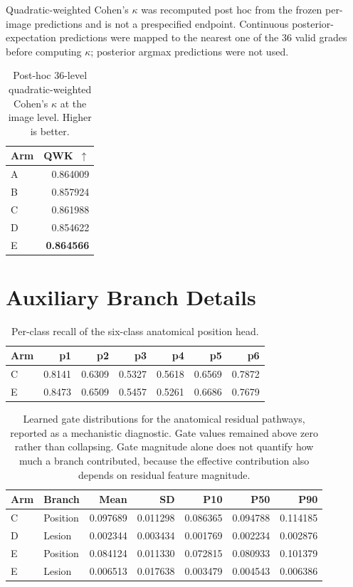 \documentclass[journal]{IEEEtran}
\begin{document}
Quadratic-weighted Cohen's $\kappa$ was recomputed post hoc from the frozen
per-image predictions and is not a prespecified endpoint. Continuous
posterior-expectation predictions were mapped to the nearest one of the 36 valid
grades before computing $\kappa$; posterior argmax predictions were not used.

\begin{table}[!t]
\centering
\caption{Post-hoc 36-level quadratic-weighted Cohen's $\kappa$ at the image
level. Higher is better.}
\label{tab:qwk}
\small
\begin{tabular}{@{}l r@{}}
\toprule
Arm & QWK~$\uparrow$ \\
\midrule
A & 0.864009 \\
B & 0.857924 \\
C & 0.861988 \\
D & 0.854622 \\
E & \textbf{0.864566} \\
\bottomrule
\end{tabular}
\end{table}

\section{Auxiliary Branch Details}

\begin{table}[!t]
\centering
\caption{Per-class recall of the six-class anatomical position head.}
\label{tab:posrec}
\small
\begin{tabular}{@{}l rrrrrr@{}}
\toprule
Arm & p1 & p2 & p3 & p4 & p5 & p6 \\
\midrule
C & 0.8141 & 0.6309 & 0.5327 & 0.5618 & 0.6569 & 0.7872 \\
E & 0.8473 & 0.6509 & 0.5457 & 0.5261 & 0.6686 & 0.7679 \\
\bottomrule
\end{tabular}
\end{table}

\begin{table}[!t]
\centering
\caption{Learned gate distributions for the anatomical residual pathways,
reported as a mechanistic diagnostic. Gate values remained above zero rather
than collapsing. Gate magnitude alone does not quantify how much a branch
contributed, because the effective contribution also depends on residual
feature magnitude.}
\label{tab:gates}
\footnotesize
\setlength{\tabcolsep}{3.5pt}
\begin{tabular}{@{}ll rrrrr@{}}
\toprule
Arm & Branch & Mean & SD & P10 & P50 & P90 \\
\midrule
C & Position & 0.097689 & 0.011298 & 0.086365 & 0.094788 & 0.114185 \\
D & Lesion   & 0.002344 & 0.003434 & 0.001769 & 0.002234 & 0.002876 \\
E & Position & 0.084124 & 0.011330 & 0.072815 & 0.080933 & 0.101379 \\
E & Lesion   & 0.006513 & 0.017638 & 0.003479 & 0.004543 & 0.006386 \\
\bottomrule
\end{tabular}
\end{table}
\end{document}
